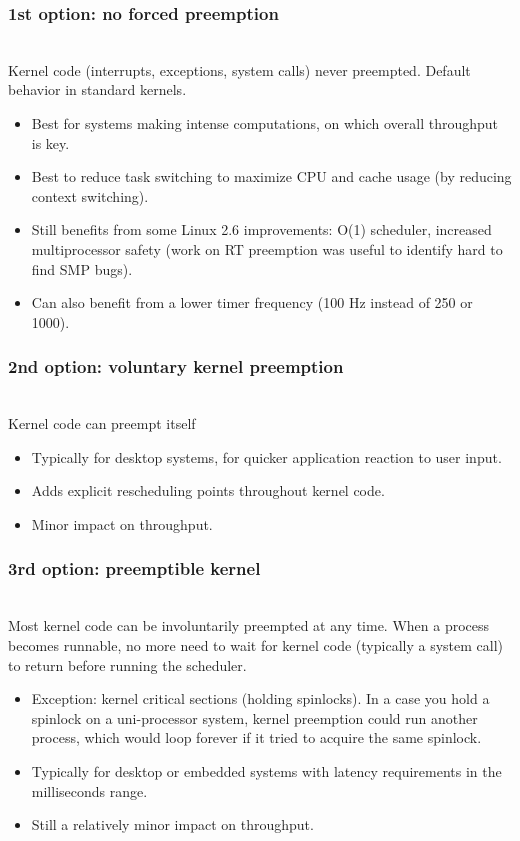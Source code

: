 \begin{frame}
  \frametitle{1st option: no forced preemption}
  \\
  Kernel code (interrupts, exceptions, system calls) never preempted.
  Default behavior in standard kernels.
  \begin{itemize}
  \item Best for systems making intense computations, on which overall
    throughput is key.
  \item Best to reduce task switching to maximize CPU and cache usage
    (by reducing context switching).
  \item Still benefits from some Linux 2.6 improvements: O(1)
    scheduler, increased multiprocessor safety (work on RT preemption
    was useful to identify hard to find SMP bugs).
  \item Can also benefit from a lower timer frequency (100 Hz instead
    of 250 or 1000).
  \end{itemize}
\end{frame}

\begin{frame}
  \frametitle{2nd option: voluntary kernel preemption}
  \\
  Kernel code can preempt itself
  \begin{itemize}
  \item Typically for desktop systems, for quicker application
    reaction to user input.
  \item Adds explicit rescheduling points throughout kernel code.
  \item Minor impact on throughput.
  \end{itemize}
\end{frame}

\begin{frame}
  \frametitle{3rd option: preemptible kernel}
  \\
  Most kernel code can be involuntarily preempted at any time.  When a
  process becomes runnable, no more need to wait for kernel code
  (typically a system call) to return before running the scheduler.
  \begin{itemize}
  \item Exception: kernel critical sections (holding spinlocks).
    In a case you hold a spinlock on a uni-processor system, kernel preemption
    could run another process, which would loop forever if it
    tried to acquire the same spinlock.
  \item Typically for desktop or embedded systems with latency
    requirements in the milliseconds range.
  \item Still a relatively minor impact on throughput.
  \end{itemize}
\end{frame}

